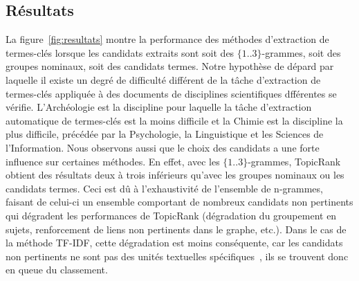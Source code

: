   \subsection{Résultats}
  \label{subsec:resultats}
    La figure~\ref{fig:resultats} montre la performance des méthodes
    d'extraction de termes-clés lorsque les candidats extraits sont soit des
    $\{1..3\}$-grammes, soit des groupes nominaux, soit des candidats termes.
    Notre hypothèse de dépard par laquelle il existe un degré de difficulté
    différent de la tâche d'extraction de termes-clés appliquée à des documents
    de disciplines scientifiques dfférentes se vérifie.
    L'Archéologie
    est la discipline pour laquelle la tâche d'extraction automatique de
    termes-clés est la moins difficile et la Chimie est la discipline la plus
    difficile, précédée par la Psychologie, la Linguistique et les Sciences de
    l'Information.
    Nous observons aussi que le choix des candidats a une forte influence sur
    certaines méthodes. En effet, avec les $\{1..3\}$-grammes, TopicRank obtient
    des résultats deux à trois inférieurs qu'avec les groupes nominaux ou les
    candidats termes. Ceci est dû à l'exhaustivité de l'ensemble de n-grammes,
    faisant de celui-ci un ensemble comportant de nombreux candidats non
    pertinents qui dégradent les performances de TopicRank (dégradation du
    groupement en sujets, renforcement de liens non pertinents dans le graphe,
    etc.). Dans le cas de la méthode TF-IDF, cette dégradation est moins
    conséquente, car les candidats non pertinents ne sont pas des unités
    textuelles spécifiques~\cite{kim2009termextraction}, ils se trouvent donc en
    queue du classement.
